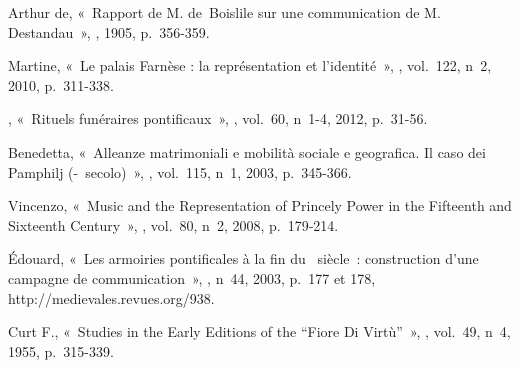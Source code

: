 \begin{teiElement}[name={TEI},change={commons\_edition}]
\begin{teiElement}[name={text},type={book},xmlid={book}]
\begin{teiElement}[name={group},type={book},xmlid={book-001}]
\begin{teiElement}[name={group},type={bibliography},data-page-title={Sources et bibliographie},data-include-href={Ch14\_Source\_bibliographie.xml},xmlid={bibliography-001}]
\begin{teiElement}[name={body}]
\begin{teiDiv}[type={section1},xmlid={div18}]
\begin{teiDiv}[type={section2},xmlid={div20}]
              \begin{teiBibl}[xmlid={bibl-428}]
 Arthur de, « Rapport de M. de Boislile sur une communication de M. Destandau », , 1905, p. 356-359.
\end{teiBibl}
              \begin{teiBibl}[xmlid={bibl-429}]
 Martine, « Le palais Farnèse : la représentation et l’identité », , vol. 122, n 2, 2010, p. 311-338.
\end{teiBibl}
              \begin{teiBibl}[xmlid={bibl-430}]
, « Rituels funéraires pontificaux », , vol. 60, n 1-4, 2012, p. 31-56.
\end{teiBibl}
              \begin{teiBibl}[xmlid={bibl-431}]
 Benedetta, « Alleanze matrimoniali e mobilità sociale e geografica. Il caso dei Pamphilj (- secolo) », , vol. 115, n 1, 2003, p. 345-366.
\end{teiBibl}
              \begin{teiBibl}[xmlid={bibl-432}]
 Vincenzo, « Music and the Representation of Princely Power in the Fifteenth and Sixteenth Century », , vol. 80, n 2, 2008, p. 179‑214.
\end{teiBibl}
              \begin{teiBibl}[xmlid={bibl-433}]
 Édouard, « Les armoiries pontificales à la fin du  siècle : construction d’une campagne de communication », , n 44, 2003, p. 177 et 178, http://medievales.revues.org/938.
\end{teiBibl}
              \begin{teiBibl}[xmlid={bibl-434}]
 Curt F., « Studies in the Early Editions of the “Fiore Di Virtù” », , vol. 49, n 4, 1955, p. 315-339.

\end{teiBibl}
\end{teiDiv}
\end{teiDiv}
\end{teiElement}
\end{teiElement}
\end{teiElement}
\end{teiElement}
\end{teiElement}
